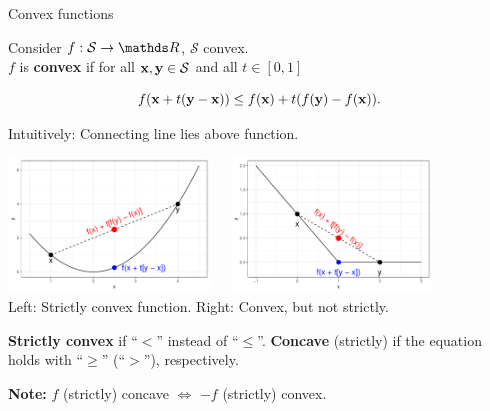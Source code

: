 \begin{vbframe}{Convex functions}

Consider $f: \mathcal{S} \to \R$, $\mathcal{S}$ convex.\\
$f$ is \textbf{convex} if for all $\mathbf{x}, \mathbf{y} \in \mathcal{S}$ and all $t \in [0, 1]$

\vspace*{-0.2cm}

$$
f(\mathbf{x} + t(\mathbf{y} - \mathbf{x})) \le f(\mathbf{x}) + t(f(\mathbf{y}) - f(\mathbf{x})).
$$

Intuitively: Connecting line lies above function.

\begin{center}
\includegraphics[width = 0.4\textwidth, keepaspectratio]{figure_man/convexity_1.pdf}~~~\includegraphics[width = 0.40\textwidth, keepaspectratio]{figure_man/convexity_2.pdf} \\
\footnotesize{Left: Strictly convex function. Right: Convex, but not strictly. }
\end{center}

\textbf{Strictly convex} if \enquote{$<$} instead of \enquote{$\le$}. \textbf{Concave} (strictly) if the equation holds with \enquote{$\ge$} (\enquote{$>$}), respectively. 

\vspace*{0.2cm}

\textbf{Note:} $f$ (strictly) concave $\Leftrightarrow$ $-f$ (strictly) convex.



\end{vbframe}

